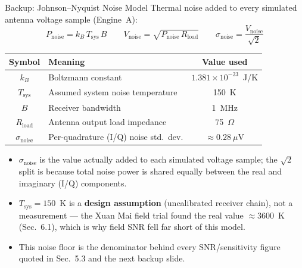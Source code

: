 \documentclass{beamer}
\newcounter{sframe}[section]
\renewcommand{\thesframe}{\thesection.\arabic{sframe}}
\newcommand{\ftitle}[1]{\stepcounter{sframe}{\normalsize\thesframe}\quad #1}
\begin{document}
\begin{frame}{\ftitle{Backup: Johnson--Nyquist Noise Model}}
\footnotesize
Thermal noise added to every simulated antenna voltage sample (Engine~A):
\[
P_{\text{noise}} = k_B\,T_{\text{sys}}\,B
\qquad
V_{\text{noise}} = \sqrt{P_{\text{noise}}\,R_{\text{load}}}
\qquad
\sigma_{\text{noise}} = \frac{V_{\text{noise}}}{\sqrt{2}}
\]
\centering
\begin{tabular}{clc}
\toprule
Symbol & Meaning & Value used \\
\midrule
$k_B$ & Boltzmann constant & $1.381\times10^{-23}$~J/K \\
$T_{\text{sys}}$ & Assumed system noise temperature & 150~K \\
$B$ & Receiver bandwidth & 1~MHz \\
$R_{\text{load}}$ & Antenna output load impedance & 75~$\Omega$ \\
$\sigma_{\text{noise}}$ & Per-quadrature (I/Q) noise std.\ dev. & $\approx0.28~\mu$V \\
\bottomrule
\end{tabular}
\vspace{6pt}
\raggedright
\begin{itemize}
\setlength{\itemsep}{2pt}
  \item $\sigma_{\text{noise}}$ is the value actually added to each simulated
  voltage sample; the $\sqrt{2}$ split is because total noise power is shared
  equally between the real and imaginary (I/Q) components.
  \item $T_{\text{sys}}=150$~K is a \textbf{design assumption} (uncalibrated
  receiver chain), not a measurement --- the Xuan Mai field trial found the
  real value $\approx3600$~K (Sec.~6.1), which is why field SNR fell far
  short of this model.
  \item[$\Rightarrow$] This noise floor is the denominator behind every
  SNR/sensitivity figure quoted in Sec.~5.3 and the next backup slide.
\end{itemize}
\end{frame}
\end{document}
